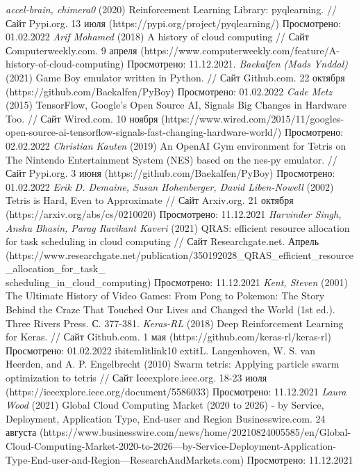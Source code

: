 \documentclass{article}
\begin{document}
\begin{center}
\begin{thebibliography}{}
 \textit{accel-brain, chimera0} (2020) Reinforcement Learning Library: pyqlearning. // Сайт Pypi.org. 13 июля (https://pypi.org/project/pyqlearning/) Просмотрено: 01.02.2022
    \textit{Arif Mohamed} (2018) A history of cloud computing // Сайт Сomputerweekly.com. 9 апреля (https://www.computerweekly.com/feature/A-history-of-cloud-computing) Просмотрено: 11.12.2021.
 \textit{Baekalfen (Mads Ynddal)} (2021) Game Boy emulator written in Python. // Сайт Github.com. 22 октября (https://github.com/Baekalfen/PyBoy) Просмотрено: 01.02.2022
 \textit{Cade Metz} (2015) TensorFlow, Google's Open Source AI, Signals Big Changes in Hardware Too. // Сайт Wired.com. 10 ноября (https://www.wired.com/2015/11/googles-open-source-ai-tensorflow-signals-fast-changing-hardware-world/) Просмотрено: 02.02.2022
 \textit{Christian Kauten} (2019) An OpenAI Gym environment for Tetris on The Nintendo Entertainment System (NES) based on the nes-py emulator. // Сайт Pypi.org. 3 июня (https://github.com/Baekalfen/PyBoy) Просмотрено: 01.02.2022
 \textit{Erik D. Demaine, Susan Hohenberger, David Liben-Nowell} (2002) Tetris is Hard, Even to Approximate // Сайт Arxiv.org. 21 октября (https://arxiv.org/abs/cs/0210020) Просмотрено: 11.12.2021
  \textit{Harvinder Singh, Anshu Bhasin, Parag Ravikant Kaveri} (2021) QRAS: efficient resource allocation for task scheduling in cloud computing // Сайт Researchgate.net. Апрель (https://www.researchgate.net/publication/350192028\_QRAS\_efficient\_resource\_allocation\_for\_task\_\\scheduling\_in\_cloud\_computing) Просмотрено: 11.12.2021
 \textit{Kent, Steven} (2001) The Ultimate History of Video Games: From Pong to Pokemon: The Story Behind the Craze That Touched Our Lives and Changed the World (1st ed.). Three Rivers Press. С. 377-381.
 \textit{Keras-RL} (2018) Deep Reinforcement Learning for Keras. // Сайт Github.com. 1 мая (https://github.com/keras-rl/keras-rl) Просмотрено: 01.02.2022
ibitem{litlink10} extit{L. Langenhoven, W. S. van Heerden, and A. P. Engelbrecht} (2010) Swarm tetris: Applying particle swarm optimization to tetris // Сайт Ieeexplore.ieee.org. 18-23 июля (https://ieeexplore.ieee.org/document/5586033) Просмотрено: 11.12.2021
    \textit{Laura Wood} (2021) Global Cloud Computing Market (2020 to 2026) - by Service, Deployment, Application Type, End-user and Region Businesswire.com. 24 августа (https://www.businesswire.com/news/home/20210824005585/en/Global-Cloud-Computing-Market-2020-to-2026---by-Service-Deployment-Application-Type-End-user-and-Region---ResearchAndMarkets.com) Просмотрено: 11.12.2021

\end{thebibliography}
\end{center}
\end{document}
